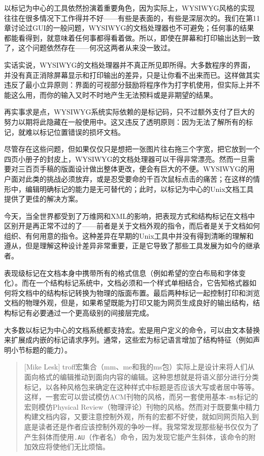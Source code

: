 \documentclass[12pt,oneside]{book}
\begin{document}
以标记为中心的工具依然扮演着重要角色，因为实际上，WYSIWYG风格的实现往往在很多情况下工作得并不好——有些是表面的，有些是深层次的。我们在第11章讨论过GUI的一般问题，WYSIWYG的文档处理器也不可避免；任何事的结果都能看得到，就意味着任何事都得看着做。所以，即使在屏幕和打印输出达到一致了，这个问题依然存在——何况这两者从来没一致过。

实话实说，WYSIWYG的文档处理器并不真正所见即所得。大多数程序的界面，并没有真正消除屏幕显示和打印输出的差异，只是让你看不出来而已。这样做其实违反了最小立异原则：界面的可视部分鼓励将程序作为打字机使用，但实际上并不能这么用，而你的输入又时不时地产生无法预料或是非期望的结果。

再实事求是点，WYSIWYG系统实际依赖的是标记码，只不过额外支付了巨大的努力以期将此隐藏在一般使用中。这又违反了透明原则：因为无法了解所有的标记，就难以标记位置错误的损坏文档。

尽管存在这些问题，但如果仅仅只是想把一张图片往右拖三个字宽，把它放到一个四页小册子的封皮上，WYSIWYG的文档处理器可以干得非常漂亮。然而一旦需要对三百页手稿的版面设计做出整体更改，便会有巨大的不便。WYSIWYG的用户面对此类的挑战必须放弃，或是忍受要命的千百次鼠标点击的痛苦；在这样的情形中，编辑明确标记的能力是无可替代的；此时，以标记为中心的Unix文档工具提供了更佳的解决方案。

今天，当全世界都受到了万维网和XML的影响，把表现方式和结构标记在文档中区别开是再正常不过的了——前者是关于文档外观的指令，而后者是关于文档如何组织、有何用意的指令。这种差异在早期的Unix工具中并没有得到清晰的理解和遵从，但是理解这种设计差异非常重要，正是它导致了那些工具发展为如今的继承者。

表现级标记在文档本身中携带所有的格式信息（例如希望的空白布局和字体变化）。而在一个结构标记系统中，文档必须和一个样式单相结合，它告知格式器如何将文档中的结构标记转换为物理的版面布置。最后两种标记一起控制打印和浏览文档的物理外观，但是，如果希望既能为打印又能为网页生成良好的输出结构，结构标记有必要通过一个更高级别的间接层完成。

大多数以标记为中心的文档系统都支持宏。宏是用户定义的命令，可以由文本替换来扩展成内嵌的标记请求序列。通常，这些宏为标记语言增加了结构特征（例如声明小节标题的能力）。

\begin{quote}[Mike Lesk]
troff宏集合（mm、me和我的ms包）实际上是设计来将人们从面向格式的编辑推动到面向内容的编辑。这种思想就是将语义部分进行分类标记，以各种风格包来确定在这种样式中标题是否应该大写或者居中等等。这样，一套宏可以尝试模仿ACM刊物的风格，而另一套使用基本\verb+-ms+标记的宏则模仿Physical Review（物理评论）刊物的风格。然而对于既要集中精力构建文档内容，又要注意控制外观，所有的宏都不好使，就如同网页陷入到底是读者还是作者应该控制外观的争吵一样。我常常发现那些秘书仅仅为了产生斜体而使用\verb+.AU+（作者名）命令，因为发现它能产生斜体，该命令的附加效应将使他们无比烦恼。
\end{quote}
\end{document}
